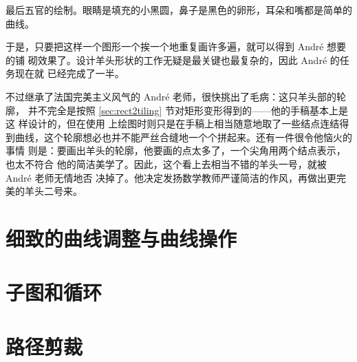 最后五官的绘制。眼睛是填充的小黑圆，鼻子是黑色的卵形，耳朵和嘴都是简单的曲线。

于是，只要把这样一个图形一个挨一个地重复画许多遍，就可以得到 André 想要的铺
砌效果了。设计羊头形状的工作无疑是最关键也最复杂的，因此 André 的任务现在就
已经完成了一半。

不过继承了法国完美主义风气的 André 老师，很快挑出了毛病：这只羊头部的轮廓，
并不完全是按照 \ref{sec:rect2tiling} 节对矩形变形得到的——他的手稿基本上是这
样设计的，但在使用 \Asy{} 上绘图时则只是在手稿上相当随意地取了一些结点连结得
到曲线，这个轮廓想必也并不能严丝合缝地一个个拼起来。还有一件很令他恼火的事情
则是：要画出羊头的轮廓，他要画的点太多了，一个尖角用两个结点表示，也太不符合
他的简洁美学了。因此，这个看上去相当不错的羊头一号，就被 André 老师无情地否
决掉了。他决定发扬数学教师严谨简洁的作风，再做出更完美的羊头二号来。

\section{细致的曲线调整与曲线操作}

\section{子图和循环}

\section{路径剪裁}

\endinput


